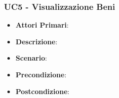 \subsubsection{UC5 - Visualizzazione Beni}
 \begin{itemize}
 	\item \textbf{Attori Primari}:
 	\item \textbf{Descrizione}:
 	\item \textbf{Scenario}:
 	\item \textbf{Precondizione}:
 	\item \textbf{Postcondizione}:
 \end{itemize}